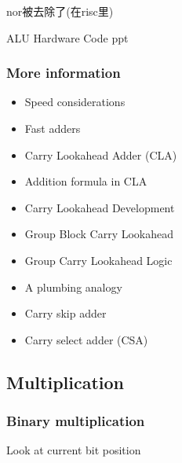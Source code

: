 
nor被去除了(在risc里)

ALU Hardware Code ppt

\subsubsection{More information}
\begin{itemize}
    \item Speed considerations
    \item Fast adders
    \item Carry Lookahead Adder (CLA)
    \item Addition formula in CLA
    \item Carry Lookahead Development
    \item Group Block Carry Lookahead
    \item Group Carry Lookahead Logic
    \item A plumbing analogy
    \item Carry skip adder
    \item Carry select adder (CSA)
\end{itemize}

\subsection{Multiplication}

\subsubsection{Binary multiplication}
Look at current bit position

